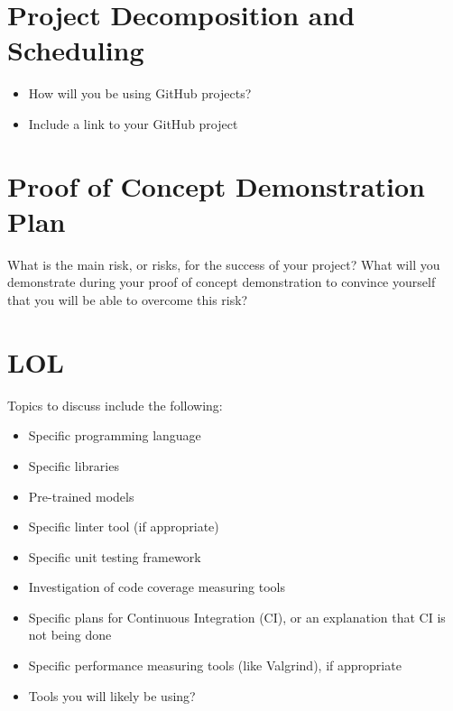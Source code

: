 \documentclass{article}
\begin{document}
\section{Project Decomposition and Scheduling}

\begin{itemize}
  \item How will you be using GitHub projects?
  \item Include a link to your GitHub project
\end{itemize}


\section{Proof of Concept Demonstration Plan}

What is the main risk, or risks, for the success of your project?  What will you
demonstrate during your proof of concept demonstration to convince yourself that
you will be able to overcome this risk?

\section{LOL}



Topics to discuss include the following:

\begin{itemize}
\item Specific programming language
\item Specific libraries
\item Pre-trained models
\item Specific linter tool (if appropriate)
\item Specific unit testing framework
\item Investigation of code coverage measuring tools
\item Specific plans for Continuous Integration (CI), or an explanation that CI
  is not being done
\item Specific performance measuring tools (like Valgrind), if
  appropriate
\item Tools you will likely be using?
\end{itemize}
\end{document}
